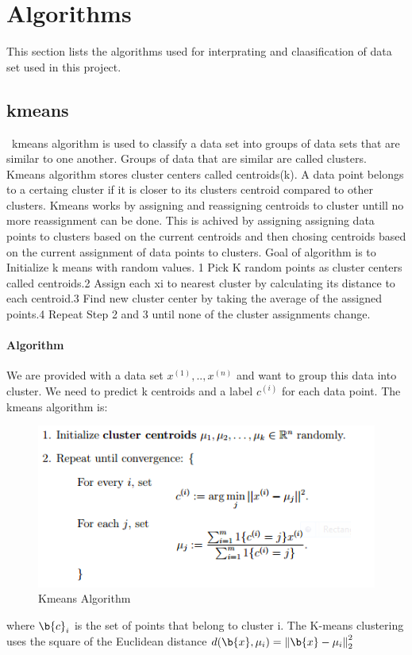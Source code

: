 \section{Algorithms}
This section lists the algorithms used for interprating and
claasification of data set used in this project.

\subsection{kmeans}
~\cite{hid-sp18-413-kmeans}kmeans algorithm is used to classify a data set into groups of data
sets that are similar to one another. Groups of data that are similar
are called clusters. Kmeans algorithm stores cluster centers called
centroids(k). A data point belongs to a certaing cluster if it is
closer to its clusters centroid   compared to other clusters.  Kmeans
works by assigning and reassigning centroids to cluster untill no more
reassignment can be done. This is achived by assigning assigning data
points to clusters based on the current centroids and then chosing
centroids based on the current assignment of data points to
clusters. Goal of algorithm is to Initialize k means with random
values. 1 Pick K random points as cluster centers called centroids.2 Assign each xi
 to nearest cluster by calculating its distance to each centroid.3  Find new cluster center by taking the average of the assigned points.4 Repeat Step 2 and 3 until none of the cluster assignments change.
\paragraph{Algorithm}
We are provided with a data set ${x^{(1)}, .. , x^{(n)}}$ and want
to group this data into cluster. We need to predict k centroids and a
label $c^{(i)}$ for each data point. The kmeans algorithm is:

\begin{figure}[!ht]
	\centering\includegraphics[width=\columnwidth]{images/kmeans.png}
	 \caption{Kmeans Algorithm}\label{f:kmeans}
\end{figure}
where $\b{c}_i$ is the set of points that belong to cluster i. The
K-means clustering uses the square of the Euclidean distance
$d(\b{x},\mu_i) = \left\Vert \b{x}-\mu_i \right\Vert_2^2$ 

